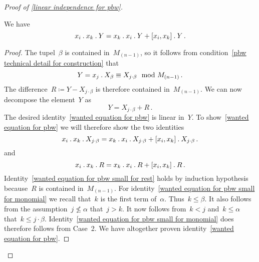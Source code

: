 \begin{proof}[Proof of \cref{linear independence for pbw}]
\begin{casedistinction}
			\begin{claim}
				We have
				\begin{equation}
					\label{wanted equation for pbw}
					x_i \mathbin{.} x_k \mathbin{.} Y
					=
					x_k \mathbin{.} x_i \mathbin{.} Y
					+ [x_i, x_k] \mathbin{.} Y \,.
				\end{equation}
			\end{claim}

			\begin{proof}
				The tupel~$\beta$ is contained in~$M_{(n-1)}$, so it follows from condition~\ref{pbw technical detail for construction} that
				\[
					Y
					=
					x_j \mathbin{.} X_\beta
					\equiv
					X_{j \cdot \beta}
					\mod
					M_{(n-1)} \,.
				\]
				The difference~$R \coloneqq Y - X_{j \cdot \beta}$ is therefore contained in~$M_{(n-1)}$.
				We can now decompose the element~$Y$ as
				\[
					Y
					=
					X_{j \cdot \beta} + R  \,.
				\]
				The desired identity~\eqref{wanted equation for pbw} is linear in~$Y$.
				To show~\eqref{wanted equation for pbw} we will therefore show the two identities
				\begin{equation}
					\label{wanted equation for pbw small for monomial}
					x_i \mathbin{.} x_k \mathbin{.} X_{j \cdot \beta}
					=
					x_k \mathbin{.} x_i \mathbin{.} X_{j \cdot \beta}
					+ [x_i, x_k] \mathbin{.} X_{j \cdot \beta} \,.
				\end{equation}
				and
				\begin{equation}
					\label{wanted equation for pbw small for rest}
					x_i \mathbin{.} x_k \mathbin{.} R
					=
					x_k \mathbin{.} x_i \mathbin{.} R
					+ [x_i, x_k] \mathbin{.} R \,.
				\end{equation}
				Identity~\eqref{wanted equation for pbw small for rest} holds by induction hypothesis because~$R$ is contained in~$M_{(n-1)}$.
				For identity~\eqref{wanted equation for pbw small for monomial} we recall that~$k$ is the first term of~$\alpha$.
				Thus~$k \leq \beta$.
				It also follows from the assumption~$j \nleq \alpha$ that~$j > k$.
				It now follows from~$k < j$ and~$k \leq \alpha$ that~$k \leq j \cdot \beta$.
				Identity~\ref{wanted equation for pbw small for monomial} does therefore follows from Case~2.
				We have altogether proven identity~\eqref{wanted equation for pbw}.
			\end{proof}


\end{casedistinction}
\end{proof}
